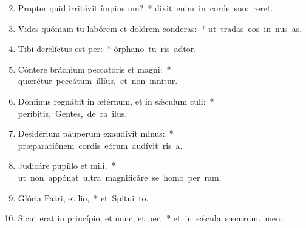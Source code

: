 \begin{flushleft}
\begin{enumerate}[leftmargin=*]
\setcounter{enumi}{1}

\item Propter quid irritávit ímpius um?~* \mbox{dixit enim in corde suo:  reret.}

\item Vides quóniam tu labórem et dolórem conderas:~* \mbox{ut tradas eos in nus as.}

\item Tibi derelíctus est per:~* \mbox{órphano tu ris adtor.}

\item Cóntere bráchium peccatóris et magni:~* \mbox{quærétur peccátum illíus, et non innitur.}

\item Dóminus regnábit in ætérnum, et in s\'{\ae}culum culi:~* \mbox{períbitis, Gentes, de ra ilus.}

\item Desidérium páuperum exaudívit minus:~* \mbox{præparatiónem cordis eórum audívit ris a.}

\item Judicáre pupíllo et mili,~* \mbox{ut non appónat ultra magnificáre se homo per ram.}

\item Glória Patri, et lio,~* \mbox{et Spitui to.}

\item Sicut erat in princípio, et nunc, et per,~* \mbox{et in s\'{\ae}cula sæcurum. men.}

\end{enumerate}
\end{flushleft}

